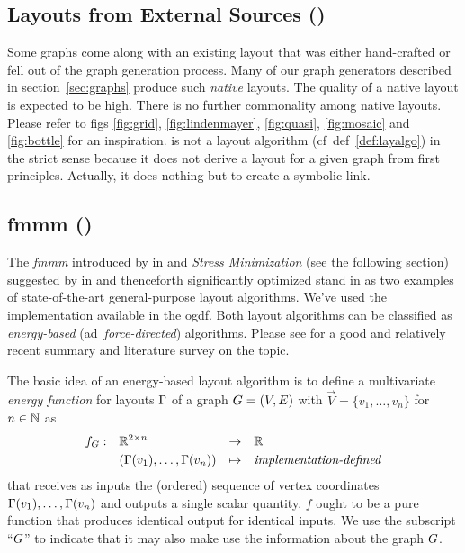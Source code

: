 \documentclass{graphstudy}
\begin{document}
\subsection{Layouts from External Sources ()}
\label{sec:native}

Some graphs come along with an existing layout that was either hand-crafted or fell out of the graph generation process.
Many of our graph generators described in \acl{section}~\ref{sec:graphs} produce such \emph{native} layouts.  The
quality of a native layout is expected to be high.  There is no further commonality among native layouts.  Please refer
to \aclp{fig} \ref{fig:grid}, \ref{fig:lindenmayer}, \ref{fig:quasi}, \ref{fig:mosaic} and \ref{fig:bottle} for an
inspiration.   is not a layout algorithm (\ac{cf}~\acs{def}~\ref{def:layalgo}) in the strict sense because
it does not derive a layout for a given graph from first principles.  Actually, it does nothing but to create a symbolic
link.

\subsection{\Acl*{fmmm} ()}
\label{sec:fmmm}

The \emph{\acf{fmmm}} introduced by \textcite{Hachul2005} in \citeyear{Hachul2005} and \emph{Stress Minimization} (see
the following section) suggested by \textcite{Kamada1989} in \citeyear{Kamada1989} and thenceforth significantly
optimized stand in as two examples of state-of-the-art general-purpose layout algorithms.  We've used the implementation
available in the \acs*{ogdf}.  Both layout algorithms can be classified as \emph{energy-based}
(\acs{ad}~\emph{force-directed}) algorithms.  Please see \textcite{Kobourov2013} for a good and relatively recent
summary and literature survey on the topic.

The basic idea of an energy-based layout algorithm is to define a multivariate \emph{energy function} for layouts
\(\Gamma\) of a graph \(G=(V,E)\) with \(\Vec{V}=\{v_1,\ldots,v_n\}\) for \(n\in\mathbb{N}\) as
\begin{equation}
  \begin{aligned}
    f_\Graph:\quad &\Reals^{2\times{}n}                &\to\quad     &\Reals\\
                   &(\Layout(v_1),\ldots,\Layout(v_n)) &\mapsto\quad &\text{\emph{implementation-defined}}
  \end{aligned}
\end{equation}
that receives as inputs the (ordered) sequence of vertex coordinates \(\Gamma(v_1),\ldots,\Gamma(v_n)\) and outputs a
single scalar quantity.  \(f\) ought to be a pure function that produces identical output for identical inputs.  We use
the subscript \enquote{\(G\)} to indicate that it may also make use the information about the graph \(G\).
\end{document}
